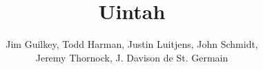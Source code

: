 \documentclass[12pt]{article}
\begin{document}
\title{Uintah}


\author{ Jim Guilkey, Todd Harman, Justin Luitjens, John Schmidt,\\ Jeremy Thornock, J. Davison de St. Germain}

\maketitle

\tableofcontents

\begin{abstract}

\end{abstract}

\newpage







%

\end{document}
